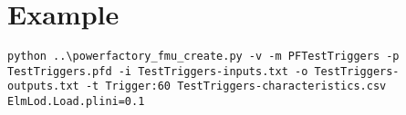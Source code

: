 \chapter{Example}

\begin{verbatim}
python ..\powerfactory_fmu_create.py -v -m PFTestTriggers -p TestTriggers.pfd -i TestTriggers-inputs.txt -o TestTriggers-outputs.txt -t Trigger:60 TestTriggers-characteristics.csv ElmLod.Load.plini=0.1
\end{verbatim}